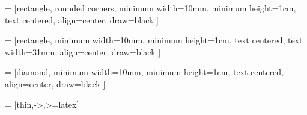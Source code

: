 \usepackage{tikz}
\usepackage{fontawesome5}
\usetikzlibrary{shapes.geometric, arrows, positioning, trees}

 = [rectangle, rounded corners,
minimum width=10mm,
minimum height=1cm,
text centered,
align=center,
draw=black
]

 = [rectangle,
minimum width=10mm,
minimum height=1cm,
text centered,
text width=31mm,
align=center,
draw=black
]

 = [diamond,
minimum width=10mm,
minimum height=1cm,
text centered,
align=center,
draw=black
]

 = [thin,->,>=latex]